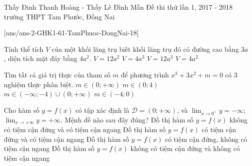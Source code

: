 \begin{name}
{Thầy Đinh Thanh Hoàng - Thầy Lê Đình Mẫn }
{Đề thi thử lần 1, 2017 - 2018 trường THPT Tam Phước, Đồng Nai}
\end{name}
\setcounter{ex}{0}
[ans/ans-2-GHK1-61-TamPhuoc-DongNai-18]
\begin{ex}%
Tính thể tích $V$ của một khối lăng trụ biết khối lăng trụ đó có đường cao bằng $3a$, diện tích mặt đáy bằng $4a^2$. 
\choice
{$V = 12a^2$}
{$V = 4a^3$}
{\True $V = 12a^3$}
{$V = 4a^2$}
\end{ex}

\begin{ex}%
Tìm tất cả giá trị thực của tham số $m$ để phương trình $x^3 + 3x^2 + m = 0$ có $3$ nghiệm thực phân biệt.
\choice
{$m \in (0; +\infty)$}
{$m \in (0; 4)$}
{$m \in (-\infty; -4) \cup (0; +\infty)$}
{\True $m \in (-4; 0)$}
\end{ex}


\begin{ex}%
Cho hàm số $y = f(x)$ có tập xác định là $\mathscr{D} = (0; +\infty)$, và $\displaystyle\lim_{x\to 0^+}y = -\infty$; $\displaystyle\lim_{x\to +\infty}y = +\infty$. Mệnh đề nào sau đây đúng?
\choice
{Đồ thị hàm số $y = f(x)$ không có tiệm cận đứng và có tiệm cận ngang}
{Đồ thị hàm số $y = f(x)$ có tiệm cận đứng và có tiệm cận ngang}
{\True Đồ thị hàm số $y = f(x)$ có tiệm cận đứng, không có tiệm cận ngang}
{Đồ thị hàm số $y = f(x)$ không có tiệm cận đứng và không có tiệm cận ngang}
\end{ex}

